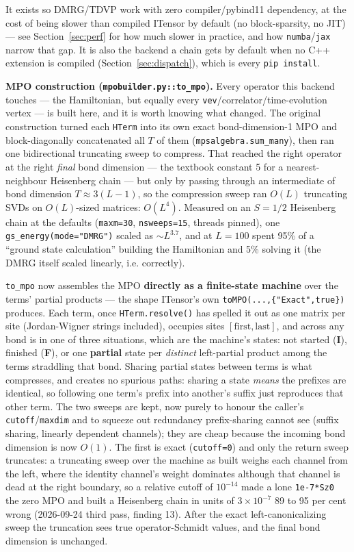 \documentclass[11pt]{article}
\begin{document}
It exists so DMRG/TDVP work with zero compiler/pybind11 dependency, at
the cost of being slower than compiled ITensor by default (no
block-sparsity, no JIT) --- see Section~\ref{sec:perf} for how much
slower in practice, and how \texttt{numba}/\texttt{jax} narrow that gap.
It is also the backend a chain gets by default when no C++ extension is
compiled (Section~\ref{sec:dispatch}), which is every \texttt{pip
install}.

\textbf{MPO construction (\texttt{mpobuilder.py::to\_mpo}).} Every
operator this backend touches --- the Hamiltonian, but equally every
\texttt{vev}/correlator/time-evolution vertex --- is built here, and it
is worth knowing what changed. The original construction turned each
\texttt{HTerm} into its own exact bond-dimension-1 MPO and
block-diagonally concatenated all $T$ of them
(\texttt{mpsalgebra.sum\_many}), then ran one bidirectional truncating
sweep to compress. That reached the right operator at the right
\emph{final} bond dimension --- the textbook constant 5 for a
nearest-neighbour Heisenberg chain --- but only by passing through an
intermediate of bond dimension $T \approx 3(L-1)$, so the compression
sweep ran $O(L)$ truncating SVDs on $O(L)$-sized matrices: $O(L^4)$.
Measured on an $S=1/2$ Heisenberg chain at the defaults
(\texttt{maxm=30}, \texttt{nsweeps=15}, threads pinned), one
\texttt{gs\_energy(mode="DMRG")} scaled as ${\sim}L^{3.7}$, and at
$L=100$ spent 95\% of a ``ground state calculation'' building the
Hamiltonian and 5\% solving it (the DMRG itself scaled linearly, i.e.
correctly).

\texttt{to\_mpo} now assembles the MPO \textbf{directly as a
finite-state machine} over the terms' partial products --- the shape
ITensor's own \texttt{toMPO(...,\{"Exact",true\})} produces. Each term,
once \texttt{HTerm.resolve()} has spelled it out as one matrix per site
(Jordan-Wigner strings included), occupies sites
$[\mathrm{first},\mathrm{last}]$, and across any bond is in one of three
situations, which are the machine's states: not started (\textbf{I}),
finished (\textbf{F}), or one \textbf{partial} state per \emph{distinct}
left-partial product among the terms straddling that bond. Sharing partial
states between terms is what compresses, and creates no spurious paths:
sharing a state \emph{means} the prefixes are identical, so following one
term's prefix into another's suffix just reproduces that other term. The
two sweeps are kept, now purely to honour the caller's
\texttt{cutoff}/\texttt{maxdim} and to squeeze out redundancy
prefix-sharing cannot see (suffix sharing, linearly dependent channels);
they are cheap because the incoming bond dimension is now $O(1)$. The
first is exact (\texttt{cutoff=0}) and only the return sweep truncates: a
truncating sweep over the machine as built weighs each channel from the
left, where the identity channel's weight dominates although that channel
is dead at the right boundary, so a relative cutoff of $10^{-14}$ made a
lone \texttt{1e-7*Sz0} the zero MPO and built a Heisenberg chain in units
of $3\times10^{-7}$ 89 to 95 per cent wrong (2026-09-24 third pass,
finding 13). After the exact left-canonicalizing sweep the truncation
sees true operator-Schmidt values, and the final bond dimension is
unchanged.
\end{document}
